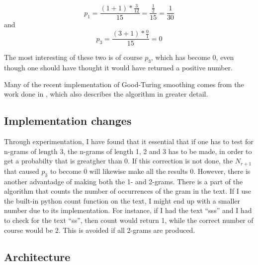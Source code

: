$$p_1 = \frac{(1 + 1) * \frac{3}{12}}{15} = \frac{\frac{1}{2}}{15} = \frac{1}{30}$$ and  
$$p_3 = \frac{(3 + 1) * \frac{0}{1}}{15} = 0$$

The most interesting of these two is of course $p_3$, which has become 0, even though one should have thought it would have returned a positive number. 

Many of the recent implementation of Good-Turing smoothing comes from the work done in \cite{Gale94good-turingsmoothing}, which also describes the algorithm in greater detail.

\subsection{Implementation changes}
Through experimentation, I have found that it essential that if one has to test for n-grams of length 3, the n-grams of length 1, 2 and 3 has to be made, in order to get a probabilty that is greatgher than 0. If this correction is not done, the $N_{r+1}$ that caused $p_3$ to become 0 will likewise make all the results 0. However, there is another advantadge of making both the 1- and 2-grams. There is a part of the algorithm that counts the number of occurrences of the gram in the text. If I use the built-in python count function on the text, I might end up with a smaller number due to its implementation. For instance, if I had the text ``sss'' and I had to check for the text ``ss'', then count would return 1, while the correct number of course would be 2. This is avoided if all 2-grams are produced. 

\subsection{Architecture}
